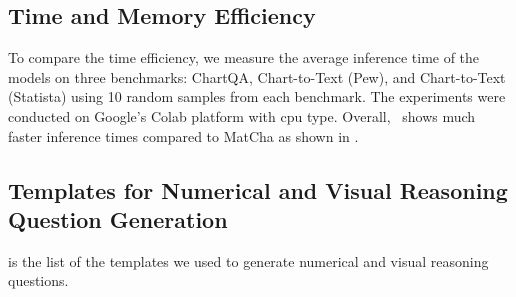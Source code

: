 \subsection{Time and Memory Efficiency}
\label{app:efficiency}
To compare the time efficiency, we measure the average inference time of the models on three benchmarks: ChartQA, Chart-to-Text (Pew), and Chart-to-Text (Statista) using 10 random samples from each benchmark. The experiments were conducted on Google's Colab platform with cpu type. Overall, \model\ shows much faster inference times compared to MatCha as shown in . 


\subsection{Templates for Numerical and Visual Reasoning Question Generation}
\label{app:template-visual-logical}
 is the list of the templates we used to generate numerical and visual reasoning questions.


